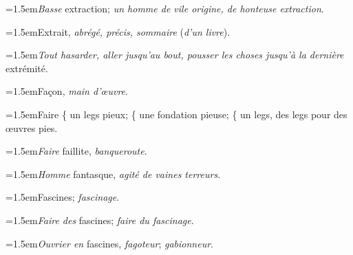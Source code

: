 \par{\dictfontsize\hangindent=1.5em\noindent \textit{Basse} extraction; \textit{un homme de vile origine, de honteuse extraction}. \par}
\par{\dictfontsize\hangindent=1.5em\noindent Extrait, \textit{abrégé, précis, sommaire} (\textit{d’un livre}). \par}
\par{\dictfontsize\hangindent=1.5em\noindent \textit{Tout hasarder, aller jusqu’au bout, pousser les choses jusqu’à la dernière} extrémité. \par}
\par{\dictfontsize\hangindent=0pt\noindent{}\par}
\par{\dictfontsize\hangindent=1.5em\noindent Façon, \textit{main d’œuvre}. \par}
\par{\dictfontsize\hangindent=1.5em\noindent Faire \{ un legs pieux; \{ une fondation pieuse; \{ un legs, des legs pour des œuvres pies. \par}
\par{\dictfontsize\hangindent=1.5em\noindent \textit{Faire} faillite, \textit{banqueroute}. \par}
\par{\dictfontsize\hangindent=1.5em\noindent \textit{Homme} fantasque, \textit{agité de vaines terreurs}. \par}
\par{\dictfontsize\hangindent=1.5em\noindent Fascines; \textit{fascinage}. \par}
\par{\dictfontsize\hangindent=1.5em\noindent \textit{Faire des} fascines; \textit{faire du fascinage}. \par}
\par{\dictfontsize\hangindent=1.5em\noindent \textit{Ouvrier en} fascines, \textit{fagoteur}; \textit{gabionneur}. \par}
